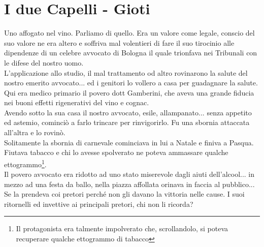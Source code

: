 
\chapter{I due Capelli - Gioti}
Uno affogato nel vino. Parliamo di quello. Era un valore come legale, conscio del suo valore ne era altero e soffriva mal volentieri di fare il suo tirocinio alle dipendenze di un celebre avvocato di Bologna il quale trionfava nei Tribunali con le difese del nostro uomo.\\
L'applicazione allo studio, il mal trattamento od altro rovinarono la salute del nostro emerito avvocato... ed i genitori lo vollero a casa per guadagnare la salute.\\
Qui era medico primario il povero dott Gamberini, che aveva una grande fiducia nei buoni effetti rigenerativi del vino e cognac.\\
Avendo sotto la sua casa il nostro avvocato, esile, allampanato... senza appetito ed astemio, cominciò a farlo trincare per rinvigorirlo. Fu una sbornia attaccata all'altra e lo rovinò.\\
Solitamente la sbornia di carnevale cominciava in lui a Natale e finiva a Pasqua. Fiutava tabacco e chi lo avesse spolverato ne poteva ammassare qualche ettogrammo\footnote{Il protagonista era talmente impolverato che, scrollandolo, si poteva recuperare qualche ettogrammo di tabacco}.\\
Il povero avvocato era ridotto ad uno stato miserevole dagli aiuti dell'alcool... in mezzo ad una festa da ballo, nella piazza affollata orinava in faccia al pubblico...\\
Se la prendeva coi pretori perché non gli davano la vittoria nelle cause. I suoi ritornelli ed invettive ai principali pretori, chi non li ricorda?
